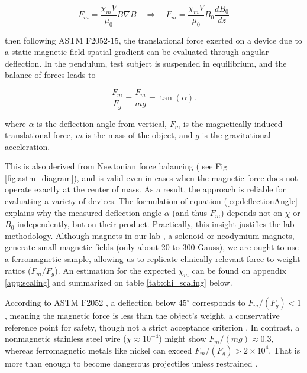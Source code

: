 \begin{equation}
	F_m = \frac{\chi_m V}{\mu_0} B \nabla B  	\quad \Rightarrow \quad  \boxed{F_m = \frac{\chi_m V}{\mu_0} B_0 \frac{dB_0}{dz}}
	\label{eq:translationalForce}
\end{equation}

\noindent then following ASTM F2052-15, the translational force exerted on a device due to a static magnetic field spatial gradient can be evaluated through angular deflection. In the pendulum, test subject is suspended in equilibrium, and the balance of forces leads to

\begin{equation}
	\frac{F_m}{F_g} = \frac{F_m}{mg} = \tan (\alpha).
	\label{eq:deflectionAngle}
\end{equation}

\noindent where $\alpha$ is the deflection angle from vertical, $F_m$ is the magnetically induced translational force, $m$ is the mass of the object, and $g$ is the gravitational acceleration. 

This is also derived from Newtonian force balancing ( see Fig \ref{fig:astm_diagram}), and is valid even in cases when the magnetic force does not operate exactly at the center of mass. As a result, the approach is reliable for evaluating a variety of devices. The formulation of equation (\ref{eq:deflectionAngle} explains why the measured deflection angle $\alpha$ (and thus $F_m$) depends not on $\chi$ or $B_0$ independently, but on their product. Practically, this insight justifies the lab methodology. Although magnets in our lab , a solenoid or neodymium magnets, generate small magnetic fields (only about 20 to 300 Gauss), we are ought to use a ferromagnetic sample, allowing us to replicate clinically relevant force-to-weight ratios ($F_m / F_g$). An estimation for the expected $\chi_m$ can be found on appendix \ref{app:scaling} and summarized on table \ref{tab:chi_scaling} below.

According to ASTM F2052 \cite{astmF2052}, a deflection below $45^{\circ}$ corresponds to $F_m / (F_g) < 1$, meaning the magnetic force is less than the object's weight, a conservative reference point for safety, though not a strict acceptance criterion \cite{Woods2021_MRIdisplacement}. In contrast,  a nonmagnetic stainless steel wire ($\chi \approx 10^{-4}$) might show $F_m / (mg) \approx 0.3$, whereas ferromagnetic metals like nickel can exceed $F_m / (F_g) > 2 \times 10^{4}$.  That is more than enough to become dangerous projectiles unless restrained \cite{aboyewa2021,Woods2021_MRIdisplacement,panych2018}.

